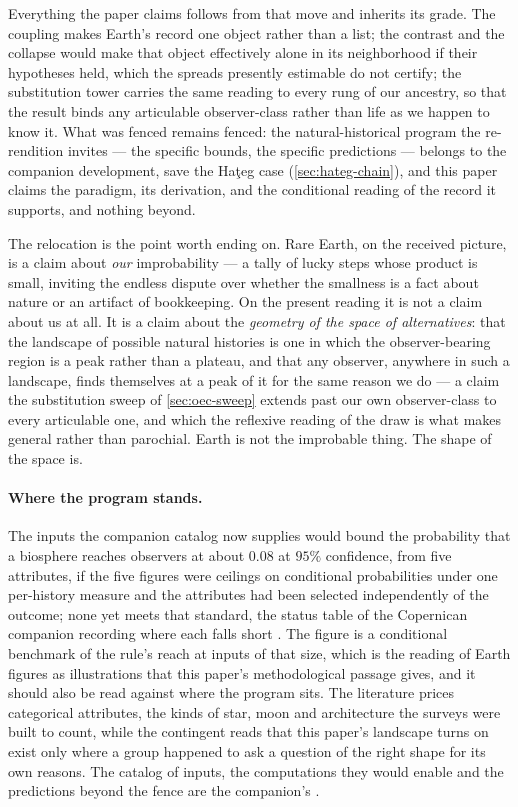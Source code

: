 \documentclass[11pt]{article}
\theoremstyle{definition}
\begin{document}
Everything the paper claims follows from that move and inherits its grade. The coupling makes Earth's record one object rather than a list; the contrast and the collapse would make that object effectively alone in its neighborhood if their hypotheses held, which the spreads presently estimable do not certify; the substitution tower carries the same reading to every rung of our ancestry, so that the result binds any articulable observer-class rather than life as we happen to know it. What was fenced remains fenced: the natural-historical program the re-rendition invites --- the specific bounds, the specific predictions --- belongs to the companion development, save the Ha\c{t}eg case (\autoref{sec:hateg-chain}), and this paper claims the paradigm, its derivation, and the conditional reading of the record it supports, and nothing beyond.

The relocation is the point worth ending on. Rare Earth, on the received picture, is a claim about \emph{our} improbability --- a tally of lucky steps whose product is small, inviting the endless dispute over whether the smallness is a fact about nature or an artifact of bookkeeping. On the present reading it is not a claim about us at all. It is a claim about the \emph{geometry of the space of alternatives}: that the landscape of possible natural histories is one in which the observer-bearing region is a peak rather than a plateau, and that any observer, anywhere in such a landscape, finds themselves at a peak of it for the same reason we do --- a claim the substitution sweep of \autoref{sec:oec-sweep} extends past our own observer-class to every articulable one, and which the reflexive reading of the draw is what makes general rather than parochial. Earth is not the improbable thing. The shape of the space is.

\paragraph{Where the program stands.} The inputs the companion catalog now supplies would bound the probability that a biosphere reaches observers at about $0.08$ at $95\%$ confidence, from five attributes, if the five figures were ceilings on conditional probabilities under one per-history measure and the attributes had been selected independently of the outcome; none yet meets that standard, the status table of the Copernican companion recording where each falls short \cite{NexicFoundation}. The figure is a conditional benchmark of the rule's reach at inputs of that size, which is the reading of Earth figures as illustrations that this paper's methodological passage gives, and it should also be read against where the program sits. The literature prices categorical attributes, the kinds of star, moon and architecture the surveys were built to count, while the contingent reads that this paper's landscape turns on exist only where a group happened to ask a question of the right shape for its own reasons. The catalog of inputs, the computations they would enable and the predictions beyond the fence are the companion's \cite{Nexus}.
\end{document}
